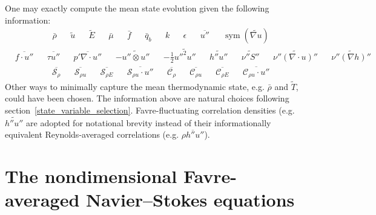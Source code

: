 \documentclass[letterpaper,11pt,nointlimits,reqno,draft]{amsbook}
\newcommand{\symmetricpart}[1]
  {\ensuremath{\operatorname{sym}\left(#1\right)}}
\newcommand{\Ssd}{\ensuremath{\mathcal{S}}} %
\newcommand{\Cs}{\ensuremath{\mathcal{C}}}  %
\begin{document}
One may exactly compute the mean state evolution given the following
information:
\begin{align}
&\bar{\rho}
&
&\tilde{u}
&
&\tilde{E}
&
&\bar{\mu}
&
&\bar{f}
&
&\bar{q}_b
&
&k
&
&\epsilon
&
&\overline{u''}
&
&\symmetricpart{\widetilde{\nabla{}u}}
\end{align}
\begin{align}
&\overline{f\cdot{}u''}
&
&\overline{\tau{}u''}
&
&\overline{p'\nabla\cdot{}u''}
&
&-\widetilde{u''\otimes{}u''}
&
&-\frac{1}{2}\widetilde{{u''}^{2}u''}
&
&\widetilde{h''u''}
&
&\widetilde{\nu''S''}
&
&\widetilde{\nu''\left(\nabla\cdot{}u\right)''}
&
&\widetilde{\nu''\left(\nabla{}h\right)''}
\end{align}
\begin{align}
&\overline{\Ssd_{\rho{}}}
&
&\overline{\Ssd_{\rho{} u}}
&
&\overline{\Ssd_{\rho{} E}}
&
&\overline{\Ssd_{\rho{} u}\cdot{}u''}
&
&\overline{\Cs_{\rho{}}}
&
&\overline{\Cs_{\rho{} u}}
&
&\overline{\Cs_{\rho{} E}}
&
&\overline{\Cs_{\rho{} u}\cdot{}u''}
\end{align}
Other ways to minimally capture the mean thermodynamic state, e.g. $\bar{\rho}$
and $\tilde{T}$, could have been chosen.  The information above are natural
choices following section~\ref{state_variable_selection}.  Favre-fluctuating
correlation densities (e.g.  $\widetilde{h''u''}$ are adopted for notational
brevity instead of their informationally equivalent Reynolds-averaged
correlations (e.g.  $\overline{\rho{}h''u''}$).

\section{The nondimensional Favre-averaged Navier--Stokes equations}
\label{sec:nondimfans}
\end{document}
